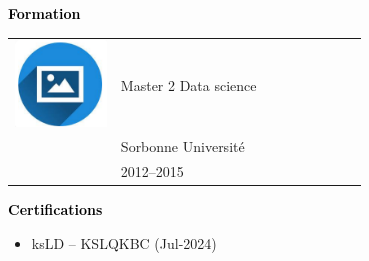 \documentclass{article}
\begin{document}
\begin{paracol}{2}
\vspace{1cm}

\textcolor{black}{\Large \textbf{Formation}} \\[2pt]

 \begin{tabular}{@{}cp{0.7\linewidth}}
      \begin{minipage}{0.05\linewidth}
        \includegraphics[width=\linewidth]{picon.png}
      \end{minipage} & \vspace{-12pt}
      {\color{sidetext} Master 2 Data science} \\[-6pt]
      & Sorbonne Université \\[-6pt]
      & 2012--2015 
    \end{tabular}

\vspace{0.5cm}

\textcolor{black}{\Large \textbf{Certifications}} \\

\begin{itemize}[leftmargin=12pt]
\item ksLD  -- KSLQKBC (Jul-2024)
\end{itemize}

\end{paracol}
\end{document}
